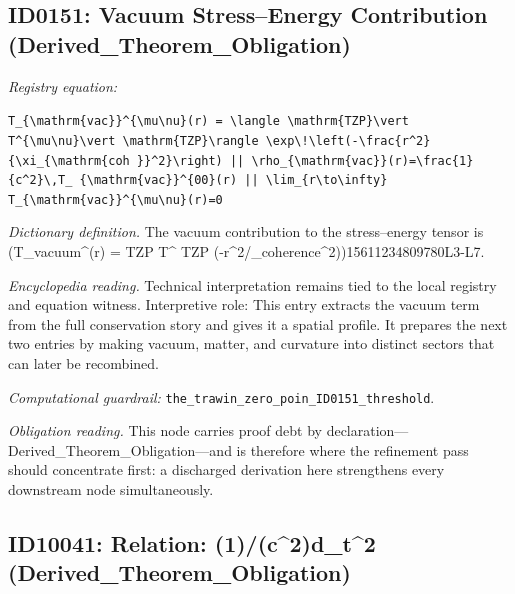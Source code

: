 \documentclass[11pt]{article}
\theoremstyle{remark}
\begin{document}
\subsection{ID0151: Vacuum Stress--Energy Contribution (Derived\_Theorem\_Obligation)}

\noindent\textit{Registry equation:}\par
{\small\texttt{T\_\{\textbackslash{}mathrm\{vac\}\}\textasciicircum{}\{\textbackslash{}mu\textbackslash{}nu\}(r) = \textbackslash{}langle \textbackslash{}mathrm\{TZP\}\textbackslash{}vert T\textasciicircum{}\{\textbackslash{}mu\textbackslash{}nu\}\textbackslash{}vert \textbackslash{}mathrm\{TZP\}\textbackslash{}rangle \textbackslash{}exp\textbackslash{}!\textbackslash{}left(-\textbackslash{}frac\{r\textasciicircum{}2\}\{\textbackslash{}xi\_\{\textbackslash{}mathrm\{coh \}\}\textasciicircum{}2\}\textbackslash{}right) || \textbackslash{}rho\_\{\textbackslash{}mathrm\{vac\}\}(r)=\textbackslash{}frac\{1\}\{c\textasciicircum{}2\}\textbackslash{},T\_ \{\textbackslash{}mathrm\{vac\}\}\textasciicircum{}\{00\}(r) || \textbackslash{}lim\_\{r\textbackslash{}to\textbackslash{}infty\} T\_\{\textbackslash{}mathrm\{vac\}\}\textasciicircum{}\{\textbackslash{}mu\textbackslash{}nu\}(r)=0}}\par\medskip
\noindent\textit{Dictionary definition.} The vacuum contribution to the stress--energy tensor is (T\_vacuum\textasciicircum{}(r) = TZP T\textasciicircum{} TZP (-r\textasciicircum{}2/\_coherence\textasciicircum{}2))15611234809780L3-L7.\par\medskip
\noindent\textit{Encyclopedia reading.} Technical interpretation remains tied to the local registry and equation witness. Interpretive role: This entry extracts the vacuum term from the full conservation story and gives it a spatial profile. It prepares the next two entries by making vacuum, matter, and curvature into distinct sectors that can later be recombined.
\par\medskip\noindent\textit{Computational guardrail:} \texttt{the\_trawin\_zero\_poin\_ID0151\_threshold}.
\par\medskip\noindent\textit{Obligation reading.} This node carries proof debt by declaration---Derived\_Theorem\_Obligation---and is therefore where the refinement pass should concentrate first: a discharged derivation here strengthens every downstream node simultaneously.

\subsection{ID10041: Relation: (1)/(c\textasciicircum{}2)d\_t\textasciicircum{}2 (Derived\_Theorem\_Obligation)}
\end{document}
